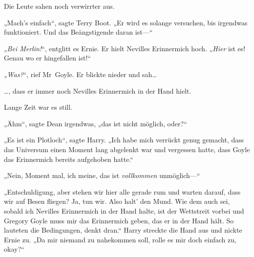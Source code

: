 Die Leute sahen noch verwirrter aus.

„Mach’s einfach“, sagte Terry Boot. „Er wird es solange versuchen, bis irgendwas funktioniert. Und das Beängstigende daran ist—“

„\emph{Bei Merlin!}“, entglitt es Ernie. Er hielt Nevilles Erinnermich hoch. „\emph{Hier} ist es! Genau wo er hingefallen ist!“

„\emph{Was?}“, rief Mr~Goyle. Er blickte nieder und sah…

…, dass er immer noch Nevilles Erinnermich in der Hand hielt.

Lange Zeit war es still.

„Ähm“, sagte Dean irgendwas, „das ist nicht möglich, oder?“

„Es ist ein Plotloch“, sagte Harry. „Ich habe mich verrückt genug gemacht, dass das Universum einen Moment lang abgelenkt war und vergessen hatte, dass Goyle das Erinnermich bereits aufgehoben hatte.“

„Nein, Moment mal, ich meine, das ist \emph{vollkommen} unmöglich—“

„Entschuldigung, aber stehen wir hier alle gerade rum und warten darauf, dass wir auf Besen fliegen? Ja, tun wir. Also halt’ den Mund. Wie dem auch sei, sobald ich Nevilles Erinnermich in der Hand halte, ist der Wettstreit vorbei und Gregory Goyle muss mir das Erinnermich geben, das er in der Hand hält. So lauteten die Bedingungen, denkt dran.“ Harry streckte die Hand aus und nickte Ernie zu. „Da mir niemand zu nahekommen soll, rolle es mir doch einfach zu, okay?“

